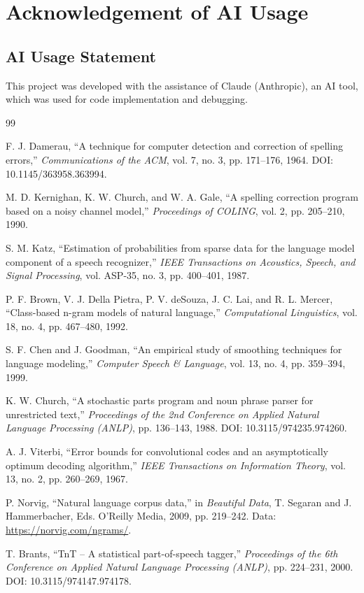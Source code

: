 \documentclass[12pt,a4paper]{report}
\begin{document}
\chapter{Acknowledgement of AI Usage}

\section{AI Usage Statement}

This project was developed with the assistance of Claude (Anthropic), an
AI tool, which was used for code implementation and debugging.

\begin{thebibliography}{99}

F. J. Damerau, ``A technique for computer detection and correction of
spelling errors,''
\textit{Communications of the ACM}, vol. 7, no. 3, pp. 171--176, 1964.
DOI: 10.1145/363958.363994.

M. D. Kernighan, K. W. Church, and W. A. Gale, ``A spelling correction
program based on a noisy channel model,''
\textit{Proceedings of COLING}, vol. 2, pp. 205--210, 1990.

S. M. Katz, ``Estimation of probabilities from sparse data for the
language model component of a speech recognizer,''
\textit{IEEE Transactions on Acoustics, Speech, and Signal Processing},
vol. ASP-35, no. 3, pp. 400--401, 1987.

P. F. Brown, V. J. Della Pietra, P. V. deSouza, J. C. Lai, and R. L.
Mercer, ``Class-based n-gram models of natural language,''
\textit{Computational Linguistics}, vol. 18, no. 4, pp. 467--480, 1992.

S. F. Chen and J. Goodman, ``An empirical study of smoothing techniques
for language modeling,''
\textit{Computer Speech \& Language}, vol. 13, no. 4, pp. 359--394, 1999.

K. W. Church, ``A stochastic parts program and noun phrase parser for
unrestricted text,''
\textit{Proceedings of the 2nd Conference on Applied Natural Language
Processing (ANLP)}, pp. 136--143, 1988. DOI: 10.3115/974235.974260.

A. J. Viterbi, ``Error bounds for convolutional codes and an
asymptotically optimum decoding algorithm,''
\textit{IEEE Transactions on Information Theory}, vol. 13, no. 2,
pp. 260--269, 1967.

P. Norvig, ``Natural language corpus data,'' in \textit{Beautiful Data},
T. Segaran and J. Hammerbacher, Eds. O'Reilly Media, 2009, pp. 219--242.
Data: \url{https://norvig.com/ngrams/}.

T. Brants, ``TnT -- A statistical part-of-speech tagger,''
\textit{Proceedings of the 6th Conference on Applied Natural Language
Processing (ANLP)}, pp. 224--231, 2000. DOI: 10.3115/974147.974178.

\end{thebibliography}
\end{document}

